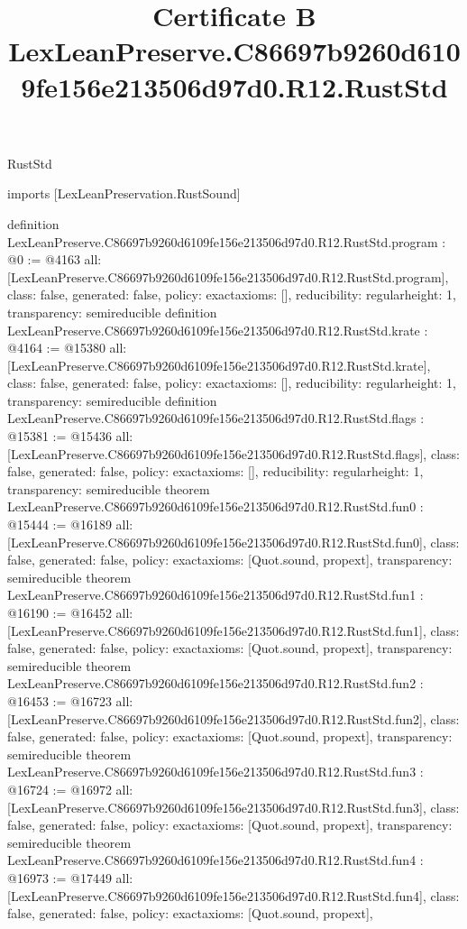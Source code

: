 \begin{lexlean}{RustStd}
\title{Certificate B LexLeanPreserve.C86697b9260d6109fe156e213506d97d0.R12.RustStd}
\begin{coremodule}
imports [LexLeanPreservation.RustSound]

definition LexLeanPreserve.C86697b9260d6109fe156e213506d97d0.R12.RustStd.program : @0 := @4163 {
  all: [LexLeanPreserve.C86697b9260d6109fe156e213506d97d0.R12.RustStd.program],
  class: false,
  generated: false,
  policy: exact{axioms: []},
  reducibility: regular{height: 1},
  transparency: semireducible
}
definition LexLeanPreserve.C86697b9260d6109fe156e213506d97d0.R12.RustStd.krate : @4164 := @15380 {
  all: [LexLeanPreserve.C86697b9260d6109fe156e213506d97d0.R12.RustStd.krate],
  class: false,
  generated: false,
  policy: exact{axioms: []},
  reducibility: regular{height: 1},
  transparency: semireducible
}
definition LexLeanPreserve.C86697b9260d6109fe156e213506d97d0.R12.RustStd.flags : @15381 := @15436 {
  all: [LexLeanPreserve.C86697b9260d6109fe156e213506d97d0.R12.RustStd.flags],
  class: false,
  generated: false,
  policy: exact{axioms: []},
  reducibility: regular{height: 1},
  transparency: semireducible
}
theorem LexLeanPreserve.C86697b9260d6109fe156e213506d97d0.R12.RustStd.fun0 : @15444 := @16189 {
  all: [LexLeanPreserve.C86697b9260d6109fe156e213506d97d0.R12.RustStd.fun0],
  class: false,
  generated: false,
  policy: exact{axioms: [Quot.sound, propext]},
  transparency: semireducible
}
theorem LexLeanPreserve.C86697b9260d6109fe156e213506d97d0.R12.RustStd.fun1 : @16190 := @16452 {
  all: [LexLeanPreserve.C86697b9260d6109fe156e213506d97d0.R12.RustStd.fun1],
  class: false,
  generated: false,
  policy: exact{axioms: [Quot.sound, propext]},
  transparency: semireducible
}
theorem LexLeanPreserve.C86697b9260d6109fe156e213506d97d0.R12.RustStd.fun2 : @16453 := @16723 {
  all: [LexLeanPreserve.C86697b9260d6109fe156e213506d97d0.R12.RustStd.fun2],
  class: false,
  generated: false,
  policy: exact{axioms: [Quot.sound, propext]},
  transparency: semireducible
}
theorem LexLeanPreserve.C86697b9260d6109fe156e213506d97d0.R12.RustStd.fun3 : @16724 := @16972 {
  all: [LexLeanPreserve.C86697b9260d6109fe156e213506d97d0.R12.RustStd.fun3],
  class: false,
  generated: false,
  policy: exact{axioms: [Quot.sound, propext]},
  transparency: semireducible
}
theorem LexLeanPreserve.C86697b9260d6109fe156e213506d97d0.R12.RustStd.fun4 : @16973 := @17449 {
  all: [LexLeanPreserve.C86697b9260d6109fe156e213506d97d0.R12.RustStd.fun4],
  class: false,
  generated: false,
  policy: exact{axioms: [Quot.sound, propext]},
}
\end{coremodule}
\end{lexlean}
